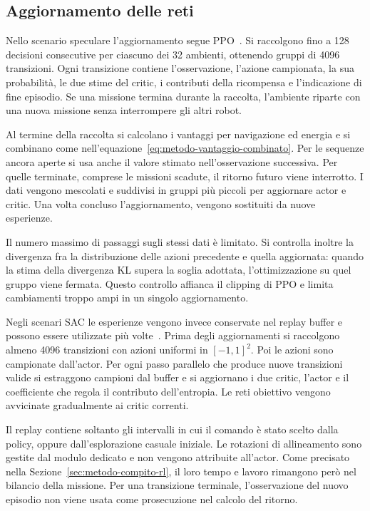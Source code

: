 \subsection{Aggiornamento delle reti}

Nello scenario speculare l'aggiornamento segue PPO~\citep{Schulman2017PPO}. Si raccolgono fino a 128 decisioni consecutive per ciascuno dei 32 ambienti, ottenendo gruppi di 4096 transizioni. Ogni transizione contiene l'osservazione, l'azione campionata, la sua probabilità, le due stime del critic, i contributi della ricompensa e l'indicazione di fine episodio. Se una missione termina durante la raccolta, l'ambiente riparte con una nuova missione senza interrompere gli altri robot.

Al termine della raccolta si calcolano i vantaggi per navigazione ed energia e si combinano come nell'equazione~\eqref{eq:metodo-vantaggio-combinato}. Per le sequenze ancora aperte si usa anche il valore stimato nell'osservazione successiva. Per quelle terminate, comprese le missioni scadute, il ritorno futuro viene interrotto. I dati vengono mescolati e suddivisi in gruppi più piccoli per aggiornare actor e critic. Una volta concluso l'aggiornamento, vengono sostituiti da nuove esperienze.

Il numero massimo di passaggi sugli stessi dati è limitato. Si controlla inoltre la divergenza fra la distribuzione delle azioni precedente e quella aggiornata: quando la stima della divergenza KL supera la soglia adottata, l'ottimizzazione su quel gruppo viene fermata. Questo controllo affianca il clipping di PPO e limita cambiamenti troppo ampi in un singolo aggiornamento.

Negli scenari SAC le esperienze vengono invece conservate nel replay buffer e possono essere utilizzate più volte~\citep{Haarnoja2018SAC}. Prima degli aggiornamenti si raccolgono almeno 4096 transizioni con azioni uniformi in $[-1,1]^2$. Poi le azioni sono campionate dall'actor. Per ogni passo parallelo che produce nuove transizioni valide si estraggono campioni dal buffer e si aggiornano i due critic, l'actor e il coefficiente che regola il contributo dell'entropia. Le reti obiettivo vengono avvicinate gradualmente ai critic correnti.

Il replay contiene soltanto gli intervalli in cui il comando è stato scelto dalla policy, oppure dall'esplorazione casuale iniziale. Le rotazioni di allineamento sono gestite dal modulo dedicato e non vengono attribuite all'actor. Come precisato nella Sezione~\ref{sec:metodo-compito-rl}, il loro tempo e lavoro rimangono però nel bilancio della missione. Per una transizione terminale, l'osservazione del nuovo episodio non viene usata come prosecuzione nel calcolo del ritorno.


